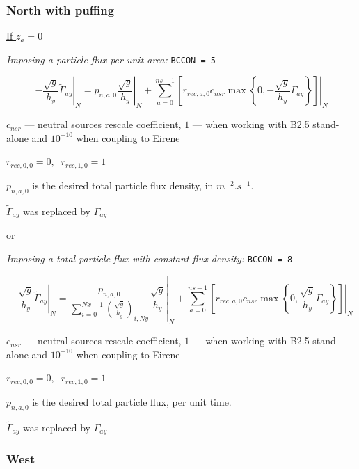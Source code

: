 \documentclass[a4paper,10pt]{report}
\begin{document}

\subsubsection{North with puffing}

\underline{If $z_a = 0$}

{\em Imposing a particle flux per unit area:} {\tt BCCON = 5}

\begin{equation}
\left. - \frac{\sqrt g}{h_y} \widetilde{\Gamma}_{ay} \right|_N
=
\left. p_{n,a,0} \frac{\sqrt g}{h_y} \right|_N
+
\left.
\sum \limits_{a=0}^{ns-1} \left[
	r_{rec,a,0} c_{nsr}
	\max \left\{0, -\frac{\sqrt g}{h_y} \Gamma_{ay} \right\}
\right] \right|_N
\end{equation}

$c_{nsr}$ --- neutral sources rescale coefficient, $1$ --- when working with B2.5 stand-alone and $10^{-10}$ when coupling to Eirene

$r_{rec,0,0} = 0,\;\; r_{rec,1,0} = 1$

$p_{n,a,0}$ is the desired total particle flux density, in $m^{-2}.s^{-1}$.

$\widetilde{\Gamma}_{ay}$ was replaced by $\Gamma_{ay}$

or

{\em Imposing a total particle flux with constant flux density:} {\tt BCCON = 8}

\begin{equation*}
\left. - \frac{\sqrt g}{h_y} \widetilde{\Gamma}_{ay} \right|_N =
\left. \frac{ p_{n,a,0}
}{
\sum \limits_{i=0}^{Nx-1} \left(
	\frac{\sqrt g}{h_y}
\right)_{i, Ny}
}
\frac{\sqrt g}{h_y} \right|_N
+
\left. \sum \limits_{a=0}^{ns-1} \left[
	r_{rec,a,0} c_{nsr}
	\max \left\{0, \frac{\sqrt g}{h_y} \Gamma_{ay} \right\}
\right]
\right|_N
\end{equation*}

$c_{nsr}$ --- neutral sources rescale coefficient, $1$ --- when working with B2.5 stand-alone and $10^{-10}$ when coupling to Eirene

$r_{rec,0,0} = 0,\;\; r_{rec,1,0} = 1$

$p_{n,a,0}$ is the desired total particle flux, per unit time.

$\widetilde{\Gamma}_{ay}$ was replaced by $\Gamma_{ay}$

\subsubsection{West}
\end{document}
